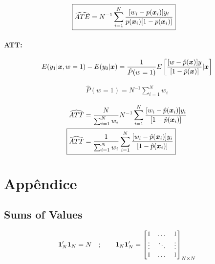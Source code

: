 \documentclass[11pt,oneside,a4paper]{article}
\numberwithin{equation}{section}
\begin{document}
\begin{description}
\begin{description}
\begin{align*}
\Aboxed{
\widehat{ATE} =
N^{-1} \sum_{i=1}^{N}
\frac{[ w_{i} - p(\mbs{x}_{i} ) ] y_{i} }{ p( \mbs{x}_{i} ) [1 - p( \mbs{x}_{i} ) ] }
}
\end{align*}

\paragraph{ATT:}

\begin{align*}
E( y_{1} | \boldsymbol{x}, w=1) - E(y_{0} | \boldsymbol{x}) =
\frac{1}{\hat{P}(w=1)}
E\left[ 
\frac{[w - \hat{p}(\boldsymbol{x})] y}{[ 1 - \hat{p}(\boldsymbol{x}) ]}
| \boldsymbol{x}
\right]
\end{align*}

\vspace{-1 em}
\begin{align*}
	\hat{P} (w = 1) = N^{-1} \sum_{i=1}^{N} w_{i}
\end{align*}

\vspace{-1.5 em}
\begin{align*}
\widehat{ATT} &=
\frac{N}{\sum_{i=1}^{N} w_{i} }
N^{-1} \sum_{i=1}^{N}
\frac{[ w_{i} - \hat{p}(\mbs{x}_{i} ) ] y_{i} }{[ 1 - \hat{p}( \mbs{x}_{i} ) ]}
\\
\Aboxed{
\widehat{ATT} &=
\frac{1}{\sum_{i=1}^{N} w_{i} }
\sum_{i=1}^{N}
\frac{[ w_{i} - \hat{p}(\mbs{x}_{i} ) ] y_{i} }{[1 - \hat{p}( \mbs{x}_{i} ) ]}
}
\end{align*}

\clearpage
\section*{Appêndice}

\subsection*{Sums of Values}
\noindent
\cite[p. 977, A.2.7]{greene-7ed}

\begin{align*}
\boldsymbol{1}_{N}' \boldsymbol{1}_{N} = N
\quad ; \qquad
\boldsymbol{1}_{N} \boldsymbol{1}_{N}' =
\begin{bmatrix}
	1 & \dots & 1	 \\
	\vdots & \ddots & \vdots \\
	1 & \dots & 1	
\end{bmatrix}_{N \times N}
\end{align*}


\end{description}
\end{description}
\end{document}
